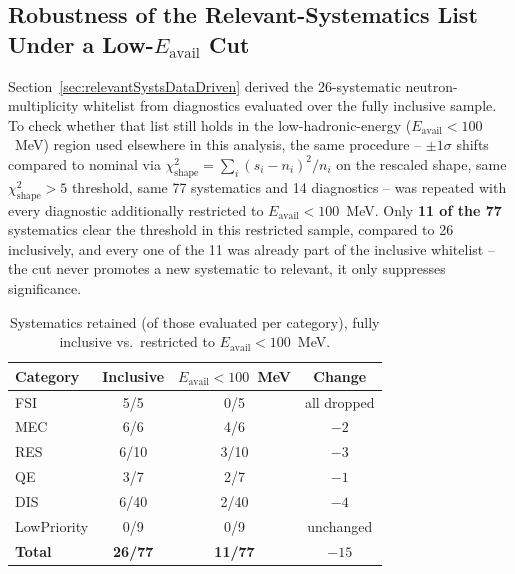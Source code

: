 \subsection{Robustness of the Relevant-Systematics List Under a Low-$E_{\mathrm{avail}}$ Cut}
\label{sec:relevantSystsQ0Lt100MeV}

Section~\ref{sec:relevantSystsDataDriven} derived the 26-systematic
neutron-multiplicity whitelist from diagnostics evaluated over the fully
inclusive sample. To check whether that list still holds in the
low-hadronic-energy ($E_{\mathrm{avail}}<100$~MeV) region used elsewhere in
this analysis, the same procedure -- $\pm1\sigma$ shifts compared to nominal
via $\chi^2_{\mathrm{shape}}=\sum_i(s_i-n_i)^2/n_i$ on the rescaled shape,
same $\chi^2_{\mathrm{shape}}>5$ threshold, same 77 systematics and 14
diagnostics -- was repeated with every diagnostic additionally restricted to
$E_{\mathrm{avail}}<100$~MeV. Only \textbf{11 of the 77} systematics clear
the threshold in this restricted sample, compared to 26 inclusively, and
every one of the 11 was already part of the inclusive whitelist -- the cut
never promotes a new systematic to relevant, it only suppresses
significance.

\begin{table}[htbp]
    \centering
    \caption{Systematics retained (of those evaluated per category), fully
    inclusive vs.\ restricted to $E_{\mathrm{avail}}<100$~MeV.}
    \label{table:relevantSystsCategoryCompare}
    \begin{tabular}{lccc}
        \toprule
        \textbf{Category} & \textbf{Inclusive} & \textbf{$E_{\mathrm{avail}}<100$~MeV} & \textbf{Change} \\
        \midrule
        FSI          & 5/5  & 0/5  & all dropped \\
        MEC          & 6/6  & 4/6  & $-2$ \\
        RES          & 6/10 & 3/10 & $-3$ \\
        QE           & 3/7  & 2/7  & $-1$ \\
        DIS          & 6/40 & 2/40 & $-4$ \\
        LowPriority  & 0/9  & 0/9  & unchanged \\
        \midrule
        \textbf{Total} & \textbf{26/77} & \textbf{11/77} & $-15$ \\
        \bottomrule
    \end{tabular}
\end{table}

